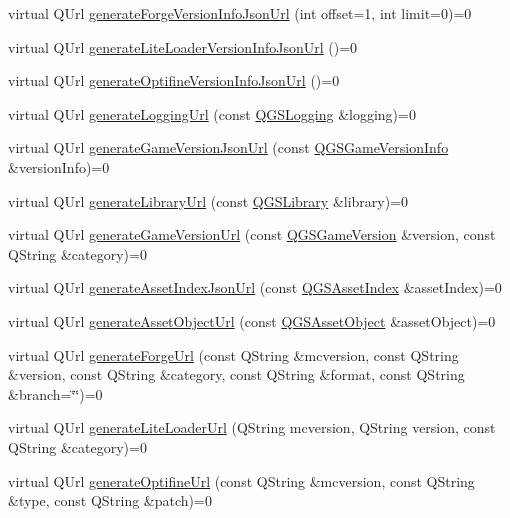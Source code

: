 \begin{DoxyCompactItemize}
virtual Q\+Url \mbox{\hyperlink{class_q_g_s_i_download_source_a26556a9ace422072f9ac996c5f054bc7}{generate\+Forge\+Version\+Info\+Json\+Url}} (int offset=1, int limit=0)=0
\item 
virtual Q\+Url \mbox{\hyperlink{class_q_g_s_i_download_source_a276656b21753de8384d457def7c23701}{generate\+Lite\+Loader\+Version\+Info\+Json\+Url}} ()=0
\item 
virtual Q\+Url \mbox{\hyperlink{class_q_g_s_i_download_source_a206fb5382716c8f34070eae836f9b742}{generate\+Optifine\+Version\+Info\+Json\+Url}} ()=0
\item 
virtual Q\+Url \mbox{\hyperlink{class_q_g_s_i_download_source_aae93e5aba009f01df11cbbc6aacac96f}{generate\+Logging\+Url}} (const \mbox{\hyperlink{class_q_g_s_logging}{Q\+G\+S\+Logging}} \&logging)=0
\item 
virtual Q\+Url \mbox{\hyperlink{class_q_g_s_i_download_source_acf738f516ec5ce173d8a346dfe65976a}{generate\+Game\+Version\+Json\+Url}} (const \mbox{\hyperlink{class_q_g_s_game_version_info}{Q\+G\+S\+Game\+Version\+Info}} \&version\+Info)=0
\item 
virtual Q\+Url \mbox{\hyperlink{class_q_g_s_i_download_source_a8726e4ed35bb7997105de8987a621957}{generate\+Library\+Url}} (const \mbox{\hyperlink{class_q_g_s_library}{Q\+G\+S\+Library}} \&library)=0
\item 
virtual Q\+Url \mbox{\hyperlink{class_q_g_s_i_download_source_a59b370202b6c3459d70cf6e7f84273e1}{generate\+Game\+Version\+Url}} (const \mbox{\hyperlink{class_q_g_s_game_version}{Q\+G\+S\+Game\+Version}} \&version, const Q\+String \&category)=0
\item 
virtual Q\+Url \mbox{\hyperlink{class_q_g_s_i_download_source_a12254719fa1c75880cc5bcd9c04d052a}{generate\+Asset\+Index\+Json\+Url}} (const \mbox{\hyperlink{class_q_g_s_asset_index}{Q\+G\+S\+Asset\+Index}} \&asset\+Index)=0
\item 
virtual Q\+Url \mbox{\hyperlink{class_q_g_s_i_download_source_acf94724d53217be5f8ed39c035f8aece}{generate\+Asset\+Object\+Url}} (const \mbox{\hyperlink{class_q_g_s_asset_object}{Q\+G\+S\+Asset\+Object}} \&asset\+Object)=0
\item 
virtual Q\+Url \mbox{\hyperlink{class_q_g_s_i_download_source_af4e1b6edc009189c6b159041f3249ce2}{generate\+Forge\+Url}} (const Q\+String \&mcversion, const Q\+String \&version, const Q\+String \&category, const Q\+String \&format, const Q\+String \&branch=\char`\"{}\char`\"{})=0
\item 
virtual Q\+Url \mbox{\hyperlink{class_q_g_s_i_download_source_aed0602232cd1cbc207747c216b3b6d30}{generate\+Lite\+Loader\+Url}} (Q\+String mcversion, Q\+String version, const Q\+String \&category)=0
\item 
virtual Q\+Url \mbox{\hyperlink{class_q_g_s_i_download_source_a123c772c2a3f8431a96f676bc0e4cc91}{generate\+Optifine\+Url}} (const Q\+String \&mcversion, const Q\+String \&type, const Q\+String \&patch)=0
\end{DoxyCompactItemize}


